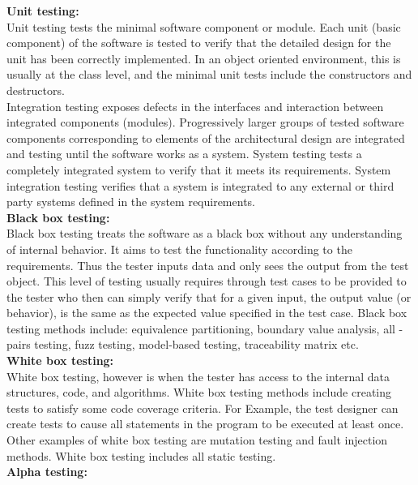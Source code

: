 \textbf{Unit testing:}\\
\hspace*{0.82cm}Unit testing tests the minimal software component or module. Each unit (basic component) of the software is tested 
to verify that the detailed design for the unit has been correctly implemented. In an object oriented environment, this is usually 
at the class level, and the minimal unit tests include the constructors and destructors.\\[0.5cm]
\hspace*{0.82cm}Integration testing exposes defects in the interfaces and interaction between integrated components (modules). 
Progressively larger groups of tested software components corresponding to elements of the architectural design are integrated and 
testing until the software works as a system. System testing tests a completely integrated system to verify that it meets its 
requirements. System integration testing verifies that a system is integrated to any external or third party systems defined in 
the system requirements.\\[0.5cm]
\textbf{Black box testing:}\\
\hspace*{0.82cm}Black box testing treats the software as a black box without any understanding of internal behavior. It aims to 
test the functionality according to the requirements. Thus the tester inputs data and only sees the output from the test object. 
This level of testing usually requires through test cases to be provided to the tester who then can simply verify that for a given 
input, the output value (or behavior), is the same as the expected value specified in the test case. Black box testing methods 
include: equivalence partitioning, boundary value analysis, all - pairs testing, fuzz testing, model-based testing, traceability 
matrix etc.\\[0.5cm]
\textbf{White box testing:}\\
\hspace*{0.82cm}White box testing, however is when the tester has access to the internal data structures, code, and algorithms. 
White box testing methods include creating tests to satisfy some code coverage criteria. For Example, the test designer can 
create tests to cause all statements in the program to be executed at least once. Other examples of white box testing are mutation 
testing and fault injection methods. White box testing includes all static testing.\\[0.5cm]
\textbf{Alpha testing:}\\
